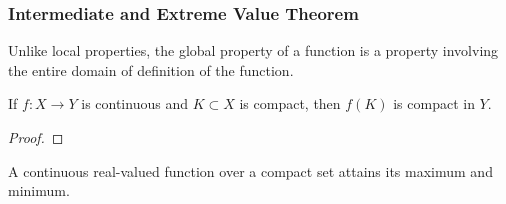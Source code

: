   \subsubsection{Intermediate and Extreme Value Theorem}

    Unlike local properties, the global property of a function is a property involving the entire domain of definition of the function. 

    \begin{theorem}
      \label{thm:compact-sets-to-compact}
      If $f: X \to Y$ is continuous and $K \subset X$ is compact, then $f(K)$ is compact in $Y$. 
    \end{theorem}
    \begin{proof}
      
    \end{proof}

    \begin{corollary}
      \label{thm:extreme-value-theorem}
      A continuous real-valued function over a compact set attains its maximum and minimum. 
    \end{corollary}


